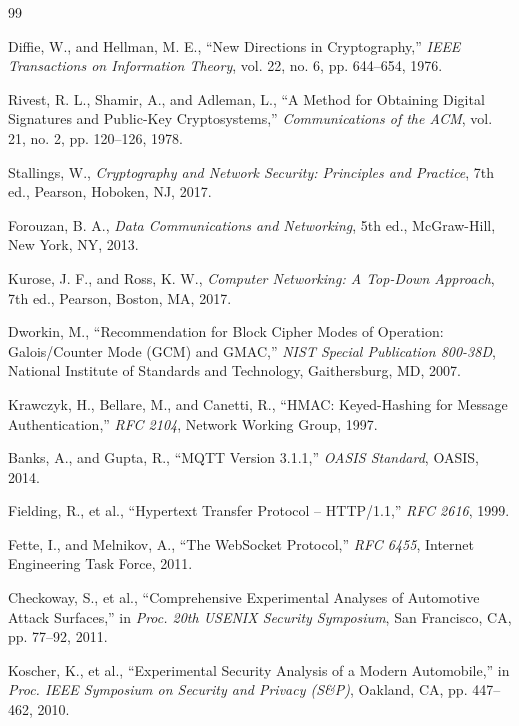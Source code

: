 \documentclass[12pt,a4paper]{report}
\begin{document}
\begin{thebibliography}{99}

Diffie, W., and Hellman, M. E., ``New Directions in Cryptography,'' \emph{IEEE Transactions on Information Theory}, vol. 22, no. 6, pp. 644--654, 1976.

Rivest, R. L., Shamir, A., and Adleman, L., ``A Method for Obtaining Digital Signatures and Public-Key Cryptosystems,'' \emph{Communications of the ACM}, vol. 21, no. 2, pp. 120--126, 1978.

Stallings, W., \emph{Cryptography and Network Security: Principles and Practice}, 7th ed., Pearson, Hoboken, NJ, 2017.

Forouzan, B. A., \emph{Data Communications and Networking}, 5th ed., McGraw-Hill, New York, NY, 2013.

Kurose, J. F., and Ross, K. W., \emph{Computer Networking: A Top-Down Approach}, 7th ed., Pearson, Boston, MA, 2017.

Dworkin, M., ``Recommendation for Block Cipher Modes of Operation: Galois/Counter Mode (GCM) and GMAC,'' \emph{NIST Special Publication 800-38D}, National Institute of Standards and Technology, Gaithersburg, MD, 2007.

Krawczyk, H., Bellare, M., and Canetti, R., ``HMAC: Keyed-Hashing for Message Authentication,'' \emph{RFC 2104}, Network Working Group, 1997.

Banks, A., and Gupta, R., ``MQTT Version 3.1.1,'' \emph{OASIS Standard}, OASIS, 2014.

Fielding, R., et al., ``Hypertext Transfer Protocol -- HTTP/1.1,'' \emph{RFC 2616}, 1999.

Fette, I., and Melnikov, A., ``The WebSocket Protocol,'' \emph{RFC 6455}, Internet Engineering Task Force, 2011.

Checkoway, S., et al., ``Comprehensive Experimental Analyses of Automotive Attack Surfaces,'' in \emph{Proc. 20th USENIX Security Symposium}, San Francisco, CA, pp. 77--92, 2011.

Koscher, K., et al., ``Experimental Security Analysis of a Modern Automobile,'' in \emph{Proc. IEEE Symposium on Security and Privacy (S\&P)}, Oakland, CA, pp. 447--462, 2010.


\end{thebibliography}
\end{document}
